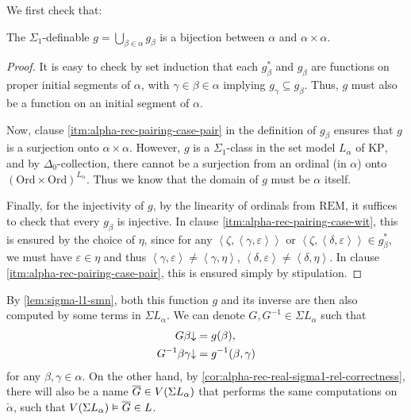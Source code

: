 \documentclass[12pt,openany]{book}
\theoremstyle{plain}
\theoremstyle{definition}
\newcommand\tuple[1]{\left\langle #1 \right\rangle}
\newcommand\KP{\mathrm{KP}}
\newcommand\CZF{\mathrm{CZF}}
\newcommand\REM{\mathrm{REM}}
\newcommand\Ord{\mathrm{Ord}}
\begin{document}
We first check that:
\begin{lemma}[$\CZF^- + \REM$]
  \label{lem:alpha-rec-pairing}
  The $\Sigma_1$-definable $g = \bigcup_{\beta \in \alpha} g_\beta$ is a bijection between $\alpha$ and $\alpha \times \alpha$.
\end{lemma}

\begin{proof}
  It is easy to check by set induction that each $g^*_\beta$ and $g_\beta$ are functions on proper initial segments of $\alpha$, with $\gamma \in \beta \in \alpha$ implying $g_\gamma \subseteq g_\beta$. Thus, $g$ must also be a function on an initial segment of $\alpha$.

  Now, clause \ref{itm:alpha-rec-pairing-case-pair} in the definition of $g_\beta$ ensures that $g$ is a surjection onto $\alpha \times \alpha$. However, $g$ is a $\Sigma_1$-class in the set model $L_\alpha$ of $\KP$, and by $\Delta_0$-collection, there cannot be a surjection from an ordinal (in $\alpha$) onto $\left(\Ord \times \Ord\right)^{L_\alpha}$. Thus we know that the domain of $g$ must be $\alpha$ itself.

  Finally, for the injectivity of $g$, by the linearity of ordinals from $\REM$, it suffices to check that every $g_\beta$ is injective. In clause \ref{itm:alpha-rec-pairing-case-wit}, this is ensured by the choice of $\eta$, since for any $\tuple{\zeta, \tuple{\gamma, \varepsilon}}$ or $\tuple{\zeta, \tuple{\delta, \varepsilon}} \in g^*_\beta$, we must have $\varepsilon \in \eta$ and thus $\tuple{\gamma, \varepsilon} \neq \tuple{\gamma, \eta}$, $\tuple{\delta, \varepsilon} \neq \tuple{\delta, \eta}$. In clause \ref{itm:alpha-rec-pairing-case-pair}, this is ensured simply by stipulation.
\end{proof}

By \autoref{lem:sigma-l1-smn}, both this function $g$ and its inverse are then also computed by some terms in $\Sigma L_\alpha$. We can denote $G, G^{-1} \in \Sigma L_\alpha$ such that
\begin{align*}
  G \beta {\downarrow}             & = g\mleft(\beta\mright),             \\
  G^{-1} \beta \gamma {\downarrow} & = g^{-1}\mleft(\beta, \gamma\mright)
\end{align*}
for any $\beta, \gamma \in \alpha$. On the other hand, by \autoref{cor:alpha-rec-real-sigma1-rel-correctness}, there will also be a name $\overline{G} \in V\mleft(\Sigma L_\alpha\mright)$ that performs the same computations on $\check{\alpha}$, such that $V\mleft(\Sigma L_\alpha\mright) \vDash \overline{G} \in L$.
\end{document}
